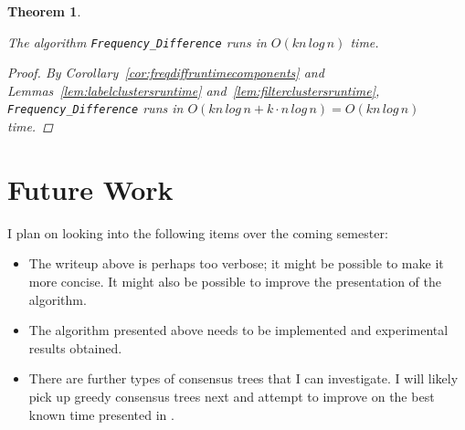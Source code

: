 \documentclass{article}
\newtheorem{freqdiffruntime}[incompatibility]{Theorem}
\begin{document}
    \begin{freqdiffruntime}
        \label{theorem:freqdiffruntime}

        The algorithm \texttt{Frequency\_Difference} runs in $O(kn\,log\,n)$ time.

        \begin{proof}
            By Corollary~\ref{cor:freqdiffruntimecomponents} and Lemmas~\ref{lem:labelclustersruntime} and~\ref{lem:filterclustersruntime}, \texttt{Frequency\_Difference} runs in $O(kn\,log\,n + k \cdot n\,log\,n) = O(kn\,log\,n)$ time.
        \end{proof}
    \end{freqdiffruntime}

    \section{Future Work}
    \label{sec:futurework}

    I plan on looking into the following items over the coming semester:
    \begin{itemize}
        \item The writeup above is perhaps too verbose; it might be possible to make it more concise. It might also be possible to improve the presentation of the algorithm.
        \item The algorithm presented above needs to be implemented and experimental results obtained.
        \item There are further types of consensus trees that I can investigate. I will likely pick up greedy consensus trees next and attempt to improve on the best known time presented in \cite{gawrychowski2017faster}.
    \end{itemize}

    \newpage
    
    
\end{document}
